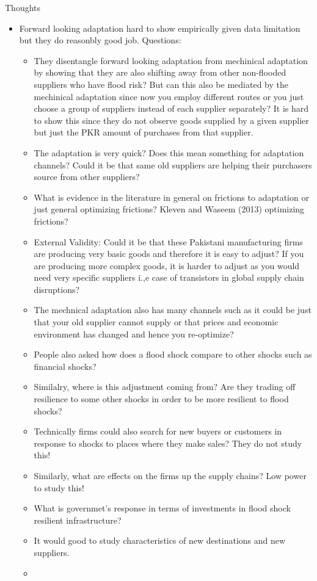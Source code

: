 \documentclass{beamer}
\begin{document}
\begin{frame}[allowframebreaks]{Thoughts}
\begin{itemize}
\item Forward looking adaptation hard to show empirically given data limitation but they do reasonbly good job. Questions:
\begin{itemize}
    \item They disentangle forward looking adaptation from mechinical adaptation by showing that they are also shifting away from other non-flooded suppliers who have flood risk? But can this also be mediated by the mechinical adaptation since now you employ different routes or you just choose a group of suppliers instead of each supplier separately? It is hard to show this since they do not observe goods supplied by a given supplier but just the PKR amount of purchases from that supplier. 
    \item The adaptation is very quick? Does this mean something for adaptation channels? Could it be that same old suppliers are helping their purchasers source from other suppliers?
    \item What is evidence in the literature in general on frictions to adaptation or just general optimizing frictions? Kleven and Waseem (2013) optimizing frictions? 
    \item External Validity: Could it be that these Pakistani manufacturing firms are producing very basic goods and therefore it is easy to adjust? If you are producing more complex goods, it is harder to adjust as you would need very specific suppliers i.,e case of transistors in global supply chain disruptions?
    \item The mechnical adaptation also has many channels such as it could be just that your old supplier cannot supply or that prices and economic environment has changed and hence you re-optimize?
    \item People also asked how does a flood shock compare to other shocks such as financial shocks? 
    \item Similalry, where is this adjustment coming from? Are they trading off resilience to some other shocks in order to be more resilient to flood shocks? 
    \item Technically firms could also search for new buyers or customers in response to shocks to places where they make sales? They do not study this!
    \item Similarly, what are effects on the firms up the supply chains? Low power to study this!
    \item What is governmet's response in terms of investments in flood shock resilient infrastructure?
    \item It would good to study characteristics of new destinations and new suppliers.
    \item 
    
    
\end{itemize}

\end{itemize}
\end{frame}
\end{document}
